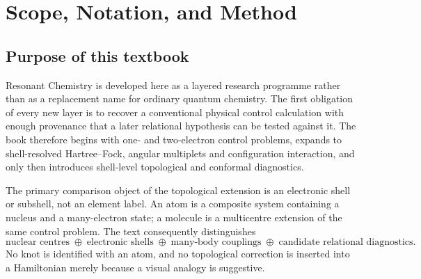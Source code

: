 \chapter{Scope, Notation, and Method}
\label{ch:scope-method}

\section{Purpose of this textbook}
Resonant Chemistry is developed here as a layered research programme rather than as a replacement name for ordinary quantum chemistry.  The first obligation of every new layer is to recover a conventional physical control calculation with enough provenance that a later relational hypothesis can be tested against it.  The book therefore begins with one- and two-electron control problems, expands to shell-resolved Hartree--Fock, angular multiplets and configuration interaction, and only then introduces shell-level topological and conformal diagnostics.

The primary comparison object of the topological extension is an electronic shell or subshell, not an element label.  An atom is a composite system containing a nucleus and a many-electron state; a molecule is a multicentre extension of the same control problem.  The text consequently distinguishes
\begin{equation}
\text{nuclear centres}\;\oplus\;\text{electronic shells}\;\oplus\;\text{many-body couplings}\;\oplus\;\text{candidate relational diagnostics}.
\end{equation}
No knot is identified with an atom, and no topological correction is inserted into a Hamiltonian merely because a visual analogy is suggestive.


